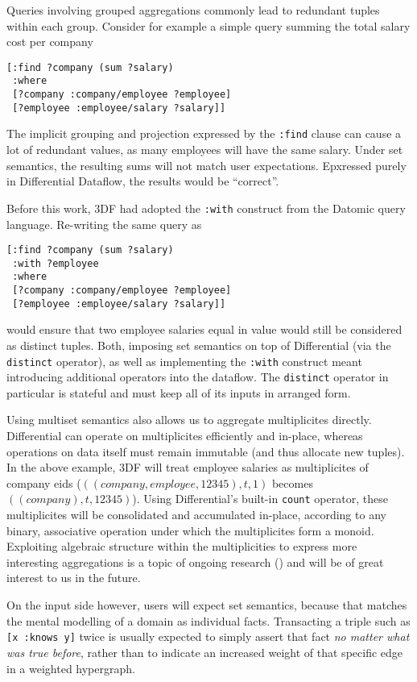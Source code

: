 \documentclass[../index.tex]{subfiles}
\begin{document}
Queries involving grouped aggregations commonly lead to redundant
tuples within each group. Consider for example a simple query summing
the total salary cost per company

\begin{verbatim}
[:find ?company (sum ?salary)
 :where
 [?company :company/employee ?employee]
 [?employee :employee/salary ?salary]]
\end{verbatim}

The implicit grouping and projection expressed by the \texttt{:find}
clause can cause a lot of redundant values, as many employees will
have the same salary. Under set semantics, the resulting sums will not
match user expectations. Epxressed purely in Differential Dataflow,
the results would be ``correct''.

Before this work, 3DF had adopted the \texttt{:with} construct from
the Datomic query language. Re-writing the same query as

\begin{verbatim}
[:find ?company (sum ?salary)
 :with ?employee
 :where
 [?company :company/employee ?employee]
 [?employee :employee/salary ?salary]]
\end{verbatim}

would ensure that two employee salaries equal in value would still be
considered as distinct tuples. Both, imposing set semantics on top of
Differential (via the \texttt{distinct} operator), as well as
implementing the \texttt{:with} construct meant introducing additional
operators into the dataflow. The \texttt{distinct} operator in
particular is stateful and must keep all of its inputs in arranged
form.

Using multiset semantics also allows us to aggregate multiplicites
directly. Differential can operate on multiplicites efficiently and
in-place, whereas operations on data itself must remain immutable (and
thus allocate new tuples). In the above example, 3DF will treat
employee salaries as multiplicites of company eids ($((company,
employee, 12345), t, 1)$ becomes $((company), t, 12345)$). Using
Differential's built-in \texttt{count} operator, these multiplicites
will be consolidated and accumulated in-place, according to any
binary, associative operation under which the multiplicites form a
monoid. Exploiting algebraic structure within the multiplicities to
express more interesting aggregations is a topic of ongoing research
(\cite{abo2016faq}) and will be of great interest to us in the future.

On the input side however, users will expect set semantics, because
that matches the mental modelling of a domain as individual
facts. Transacting a triple such as \texttt{[x :knows y]} twice is
usually expected to simply assert that fact \emph{no matter what was
  true before}, rather than to indicate an increased weight of that
specific edge in a weighted hypergraph.
\end{document}
